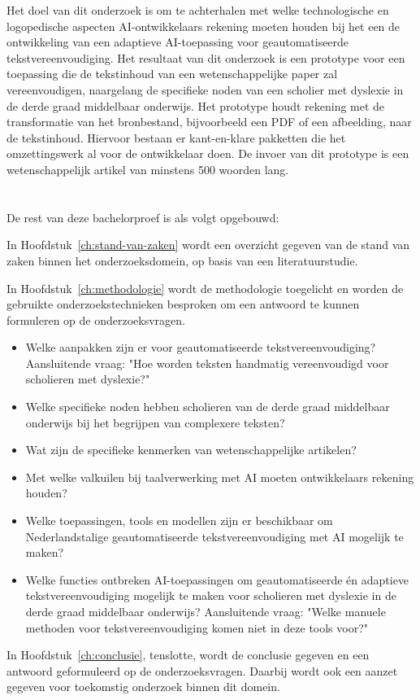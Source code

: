 
Het doel van dit onderzoek is om te achterhalen met welke technologische en logopedische aspecten AI-ontwikkelaars rekening moeten houden bij het een de ontwikkeling van een adaptieve AI-toepassing voor geautomatiseerde tekstvereenvoudiging. Het resultaat van dit onderzoek is een prototype voor een toepassing die de tekstinhoud van een wetenschappelijke paper zal vereenvoudigen, naargelang de specifieke noden van een scholier met dyslexie in de derde graad middelbaar onderwijs. Het prototype houdt rekening met de transformatie van het bronbestand, bijvoorbeeld een PDF of een afbeelding, naar de tekstinhoud. Hiervoor bestaan er kant-en-klare pakketten die het omzettingswerk al voor de ontwikkelaar doen. De invoer van dit prototype is een wetenschappelijk artikel van minstens 500 woorden lang.

\section{}%
\label{sec:opzet-bachelorproef}

De rest van deze bachelorproef is als volgt opgebouwd:

In Hoofdstuk~\ref{ch:stand-van-zaken} wordt een overzicht gegeven van de stand van zaken binnen het onderzoeksdomein, op basis van een literatuurstudie.

In Hoofdstuk~\ref{ch:methodologie} wordt de methodologie toegelicht en worden de gebruikte onderzoekstechnieken besproken om een antwoord te kunnen formuleren op de onderzoeksvragen.

\begin{itemize}
	\item Welke aanpakken zijn er voor geautomatiseerde tekstvereenvoudiging? Aansluitende vraag: "Hoe worden teksten handmatig vereenvoudigd voor scholieren met dyslexie?"
	\item Welke specifieke noden hebben scholieren van de derde graad middelbaar onderwijs bij het begrijpen van complexere teksten?
	\item Wat zijn de specifieke kenmerken van wetenschappelijke artikelen? 
	\item Met welke valkuilen bij taalverwerking met AI moeten ontwikkelaars rekening houden?
	\item Welke toepassingen, tools en modellen zijn er beschikbaar om Nederlandstalige geautomatiseerde tekstvereenvoudiging met AI mogelijk te maken?
	\item Welke functies ontbreken AI-toepassingen om geautomatiseerde én adaptieve tekstvereenvoudiging mogelijk te maken voor \newline scholieren met dyslexie in de derde graad middelbaar onderwijs? Aansluitende vraag: "Welke manuele methoden voor tekstvereenvoudiging komen niet in deze tools voor?"
\end{itemize}

In Hoofdstuk~\ref{ch:conclusie}, tenslotte, wordt de conclusie gegeven en een antwoord geformuleerd op de onderzoeksvragen. Daarbij wordt ook een aanzet gegeven voor toekomstig onderzoek binnen dit domein.